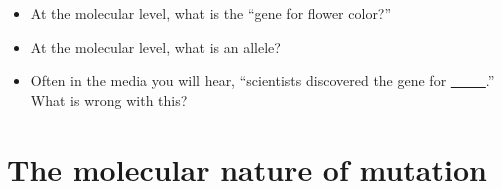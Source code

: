 \begin{frame}[t]
    \begin{adjustwidth}{-1.5em}{-1.5em}
        \begin{itemize}
            \item At the molecular level, what is the ``gene for flower
                color?''


                \vspace{8mm}
            \item At the molecular level, what is an allele?


                \vspace{1.2cm}
            \item Often in the media you will hear, ``scientists discovered the
                gene for \underline{\ \ \ \ \ }.'' What is wrong with this?

        \end{itemize}
    \end{adjustwidth}
\end{frame}

\section{The molecular nature of mutation}





\clickerslide{
\begin{frame}
    \begin{clickerquestion}
        \item 
        \begin{clickeroptions}
            \item 
            \item 
            \item 
            \item 
        \end{clickeroptions}
    \end{clickerquestion}
\end{frame}
}
